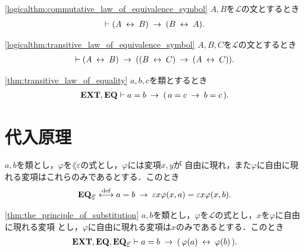 	\begin{screen}
		\begin{logicalthm}[同値関係の可換律]
		\ref{logicalthm:commutative_law_of_equivalence_symbol}
			$A,B$を$\mathcal{L}$の文とするとき
			\begin{align}
				\vdash (A \hspace{0.25em}\leftrightarrow\hspace{0.25em} B) \hspace{0.25em}\rightarrow\hspace{0.25em} (B \hspace{0.25em}\leftrightarrow\hspace{0.25em} A).
			\end{align}
		\end{logicalthm}
	\end{screen}
	
	\begin{screen}
		\begin{logicalthm}[同値関係の推移律]
		\ref{logicalthm:transitive_law_of_equivalence_symbol}
			$A,B,C$を$\mathcal{L}$の文とするとき
			\begin{align}
				\vdash (A \hspace{0.25em}\leftrightarrow\hspace{0.25em} B) \hspace{0.25em}\rightarrow\hspace{0.25em} ((B \hspace{0.25em}\leftrightarrow\hspace{0.25em} C) \hspace{0.25em}\rightarrow\hspace{0.25em} 
				(A \hspace{0.25em}\leftrightarrow\hspace{0.25em} C)).
			\end{align}
		\end{logicalthm}
	\end{screen}
	
	\begin{screen}
		\begin{thm}[等号の推移律]\ref{thm:transitive_law_of_equality}
			$a,b,c$を類とするとき
			\begin{align}
				\mbox{{\bf EXT}},\mbox{{\bf EQ}} \vdash a = b \hspace{0.25em}\rightarrow\hspace{0.25em} (\, a = c \hspace{0.25em}\rightarrow\hspace{0.25em} b = c\, ).
			\end{align}
		\end{thm}
	\end{screen}
	
\section{代入原理}
	\begin{screen}
		\begin{axm}
			$a,b$を類とし，$\varphi$を$\lang{\varepsilon}$の式とし，$\varphi$には変項$x,y$が
			自由に現れ，また$\varphi$に自由に現れる変項はこれらのみであるとする．このとき
			\begin{align}
				\EQAXEP \defarrow
				a = b \rarrow \varepsilon x \varphi(x,a) = \varepsilon x \varphi(x,b).
			\end{align}
		\end{axm}
	\end{screen}
	
	\begin{screen}
		\begin{thm}[代入原理]\ref{thm:the_principle_of_substitution}
			$a,b$を類とし，$\varphi$を$\mathcal{L}$の式とし，$x$を$\varphi$に自由に現れる変項
			とし，$\varphi$に自由に現れる変項は$x$のみであるとする．このとき
			\begin{align}
				\EXTAX,\EQAX,\EQAXEP \vdash a = b \rarrow 
				(\, \varphi(a) \lrarrow \varphi(b)\, ).
			\end{align}
		\end{thm}
	\end{screen}

